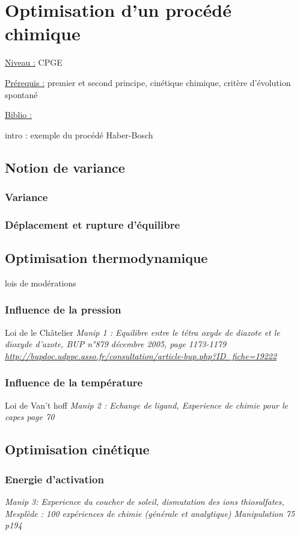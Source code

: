 \documentclass{article}%
\begin{document}
\section{Optimisation d'un procédé chimique}
\underline{Niveau :} CPGE 

\underline{Prérequis :} premier et second principe, cinétique chimique, critère d'évolution spontané

\underline{Biblio :} 

intro : exemple du procédé Haber-Bosch

\subsection{Notion de variance}
\subsubsection{Variance}
\subsubsection{Déplacement et rupture d'équilibre}
\subsection{Optimisation thermodynamique}
lois de modérations
\subsubsection{Influence de la pression}
Loi de le Châtelier
\textit{Manip 1 : Equilibre entre le tétra oxyde de diazote et le dioxyde d’azote, BUP n°879 décembre 2005, page 1173-1179 \url{http://bupdoc.udppc.asso.fr/consultation/article-bup.php?ID\_fiche=19222}}
\subsubsection{Influence de la température}
Loi de Van't hoff
\textit{Manip 2 : Echange de ligand, Experience de chimie pour le capes page 70}
\subsection{Optimisation cinétique}
\subsubsection{Energie d'activation}
\textit{Manip 3: Experience du coucher de soleil, dismutation des ions thiosulfates, Mesplède : 100 expériences de chimie (générale et analytique) Manipulation 75 p194}
\end{document}
